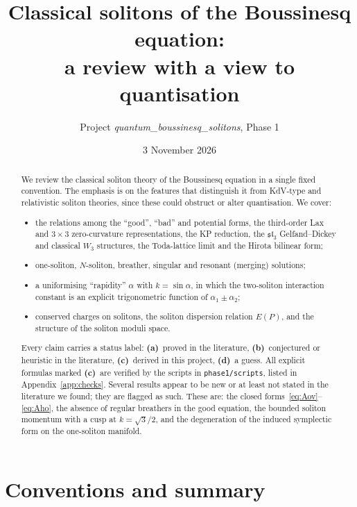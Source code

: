 \documentclass[11pt,a4paper]{article}
\title{Classical solitons of the Boussinesq equation:\\ a review with a view to quantisation}
\author{Project \emph{quantum\_boussinesq\_solitons}, Phase 1}
\date{3 November 2026}
\newcommand{\La}{\textsf{\textbf{(a)}}}
\newcommand{\Lb}{\textsf{\textbf{(b)}}}
\newcommand{\Lc}{\textsf{\textbf{(c)}}}
\newcommand{\Ld}{\textsf{\textbf{(d)}}}
\theoremstyle{remark}
\begin{document}
\maketitle

\begin{abstract}
We review the classical soliton theory of the Boussinesq equation in a single fixed convention. The emphasis is on the features that distinguish it from KdV-type and relativistic soliton theories, since these could obstruct or alter quantisation. We cover:
\begin{itemize}
\item the relations among the ``good'', ``bad'' and potential forms, the third-order Lax and $3\times3$ zero-curvature representations, the KP reduction, the $\mathfrak{sl}_3$ Gelfand--Dickey and classical $W_3$ structures, the Toda-lattice limit and the Hirota bilinear form;
\item one-soliton, $N$-soliton, breather, singular and resonant (merging) solutions;
\item a uniformising ``rapidity'' $\alpha$ with $k=\sin\alpha$, in which the two-soliton interaction constant is an explicit trigonometric function of $\alpha_1\pm\alpha_2$;
\item conserved charges on solitons, the soliton dispersion relation $E(P)$, and the structure of the soliton moduli space.
\end{itemize}
Every claim carries a status label: \La\ proved in the literature, \Lb\ conjectured or heuristic in the literature, \Lc\ derived in this project, \Ld\ a guess. All explicit formulas marked \Lc\ are verified by the scripts in \texttt{phase1/scripts}, listed in Appendix~\ref{app:checks}. Several results appear to be new or at least not stated in the literature we found; they are flagged as such. These are: the closed forms~\eqref{eq:Aov}--\eqref{eq:Aho}, the absence of regular breathers in the good equation, the bounded soliton momentum with a cusp at $k=\sqrt3/2$, and the degeneration of the induced symplectic form on the one-soliton manifold.
\end{abstract}

\tableofcontents

\section{Conventions and summary}\label{sec:conv}
\end{document}
